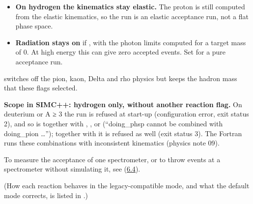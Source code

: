 \begin{itemize}
\item \textbf{On hydrogen the kinematics stay elastic.} The proton is still computed from the elastic kinematics, so the run is an
elastic acceptance run, not a flat phase space.
\item \textbf{Radiation stays on} if , with the photon limits computed for a target mass of 0. At high energy this
can give zero accepted events. Set  for a pure acceptance run.
\end{itemize}
\hyperref[param:doingu5fphsp]{} switches off the pion, kaon, Delta and rho physics but keeps the hadron mass that these flags selected.

\textbf{Scope in SIMC++: hydrogen only, without another reaction flag.} On deuterium or A ≥ 3 the run is refused at
start-up (configuration error, exit status 2), and so is  together with , ,
 or  (``doing\_phsp cannot be combined with doing\_pion \ldots''); together with
 it is refused as well (exit status 3). The Fortran runs these combinations with inconsistent kinematics
(physics note 09).

To measure the acceptance of one spectrometer,\allowbreak{} or to throw events at a spectrometer without simulating it, see
\hyperref[param:spectu5fmode]{} (\hyperref[user_manual-06u5fspectrometers:64-spectu5fmode-switching-the-spectrometer-monte-carlo-off]{6.4}).

(How each reaction behaves in the legacy-compatible mode, and what the default mode corrects, is listed in
.)

